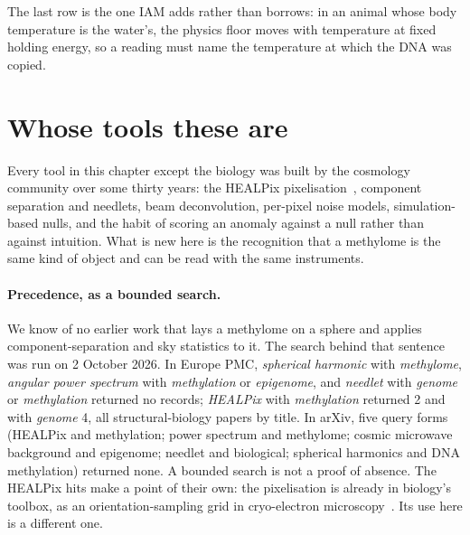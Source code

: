 The last row is the one IAM adds rather than borrows: in an animal whose body temperature is the water's, the physics floor moves with
temperature at fixed holding energy, so a reading must name the temperature at which the DNA was copied.

\section{Whose tools these are}\label{sec:p4whosetools}

Every tool in this chapter except the biology was built by the cosmology community over some thirty years: the HEALPix
pixelisation~\cite{Gorski2005}, component separation and needlets, beam deconvolution, per-pixel noise models, simulation-based nulls,
and the habit of scoring an anomaly against a null rather than against intuition. What is new here is the recognition that a
methylome is the same kind of object and can be read with the same instruments.

\paragraph{Precedence, as a bounded search.} We know of no earlier work that lays a methylome on a sphere and applies component-separation
and sky statistics to it. The search behind that sentence was run on 2 October 2026. In Europe PMC, \emph{spherical harmonic} with \emph{methylome},
\emph{angular power spectrum} with \emph{methylation} or \emph{epigenome}, and \emph{needlet} with \emph{genome} or \emph{methylation}
returned no records; \emph{HEALPix} with \emph{methylation} returned 2 and with \emph{genome} 4, all structural-biology papers by title.
In arXiv, five query forms (HEALPix and methylation; power spectrum and methylome; cosmic microwave background and epigenome; needlet and
biological; spherical harmonics and DNA methylation) returned none. \observed{} A bounded search is not a proof of absence. The HEALPix
hits make a point of their own: the pixelisation is already in biology's toolbox, as an orientation-sampling grid in cryo-electron
microscopy~\cite{Scheres2012}. Its use here is a different one.
